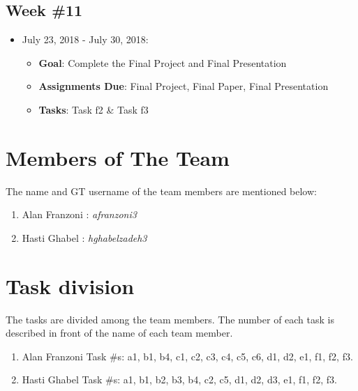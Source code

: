 \documentclass{sigchi}
\begin{document}
 \subsection{Week \#11}
\begin{itemize}
 	\item July 23, 2018 - July 30, 2018:
	\begin{itemize}
 		\item \textbf{Goal}: Complete the Final Project and Final Presentation
 		\item \textbf{Assignments Due}: Final Project, Final Paper, Final Presentation
 		\item \textbf{Tasks}: Task f2 \& Task f3
	\end{itemize} 
 \end{itemize} 


\section{Members of The Team}
The name and GT username of the team members are mentioned below:
 
\begin{enumerate}
	\item Alan Franzoni : \textit{afranzoni3}
	\item Hasti Ghabel : \textit{hghabelzadeh3}
\end{enumerate}


\section{Task division}
The tasks are divided among the team members. The number of each task is described in front of the name of each team member.
 
\begin{enumerate}
	\item Alan Franzoni Task \#s: a1, b1, b4, c1, c2, c3, c4, c5, c6, d1, d2, e1, f1, f2, f3.
	\item Hasti Ghabel Task \#s: a1, b1, b2, b3, b4, c2, c5, d1, d2, d3, e1, f1, f2, f3.
\end{enumerate}



\balance{}

\balance{}



\end{document}
